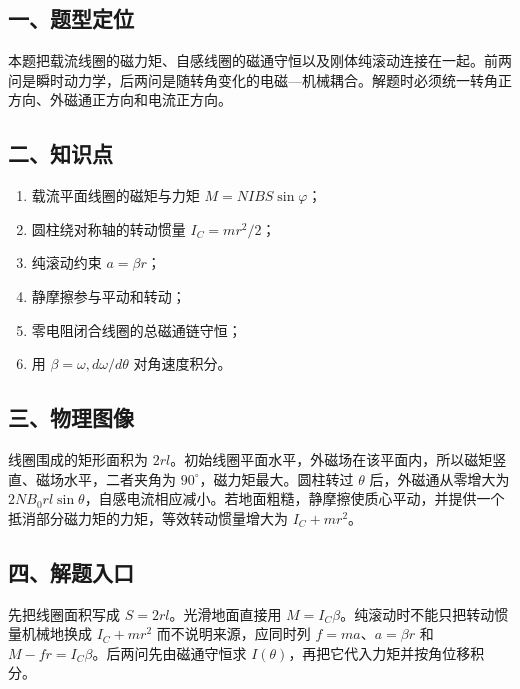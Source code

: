 \documentclass[12pt,a4paper,UTF8]{ctexart}
\newcommand{\tightlist}{\setlength{\itemsep}{0pt}\setlength{\parskip}{0pt}}
\begin{document}
\subsection{一、题型定位}\label{ux4e00ux9898ux578bux5b9aux4f4d-4}

本题把载流线圈的磁力矩、自感线圈的磁通守恒以及刚体纯滚动连接在一起。前两问是瞬时动力学，后两问是随转角变化的电磁---机械耦合。解题时必须统一转角正方向、外磁通正方向和电流正方向。

\subsection{二、知识点}\label{ux4e8cux77e5ux8bc6ux70b9-4}

\begin{enumerate}
\def\labelenumi{\arabic{enumi}.}
\tightlist
\item
  载流平面线圈的磁矩与力矩 \(M=NIBS\sin\varphi\)；
\item
  圆柱绕对称轴的转动惯量 \(I_C=mr^2/2\)；
\item
  纯滚动约束 \(a=\beta r\)；
\item
  静摩擦参与平动和转动；
\item
  零电阻闭合线圈的总磁通链守恒；
\item
  用 \(\beta=\omega,d\omega/d\theta\) 对角速度积分。
\end{enumerate}

\subsection{三、物理图像}\label{ux4e09ux7269ux7406ux56feux50cf-4}

线圈围成的矩形面积为
\(2rl\)。初始线圈平面水平，外磁场在该平面内，所以磁矩竖直、磁场水平，二者夹角为
\(90^\circ\)，磁力矩最大。圆柱转过 \(\theta\) 后，外磁通从零增大为
\(2NB_0rl\sin\theta\)，自感电流相应减小。若地面粗糙，静摩擦使质心平动，并提供一个抵消部分磁力矩的力矩，等效转动惯量增大为
\(I_C+mr^2\)。

\subsection{四、解题入口}\label{ux56dbux89e3ux9898ux5165ux53e3-4}

先把线圈面积写成 \(S=2rl\)。光滑地面直接用
\(M=I_C\beta\)。纯滚动时不能只把转动惯量机械地换成 \(I_C+mr^2\)
而不说明来源，应同时列 \(f=ma\)、\(a=\beta r\) 和
\(M-fr=I_C\beta\)。后两问先由磁通守恒求
\(I(\theta)\)，再把它代入力矩并按角位移积分。
\end{document}
